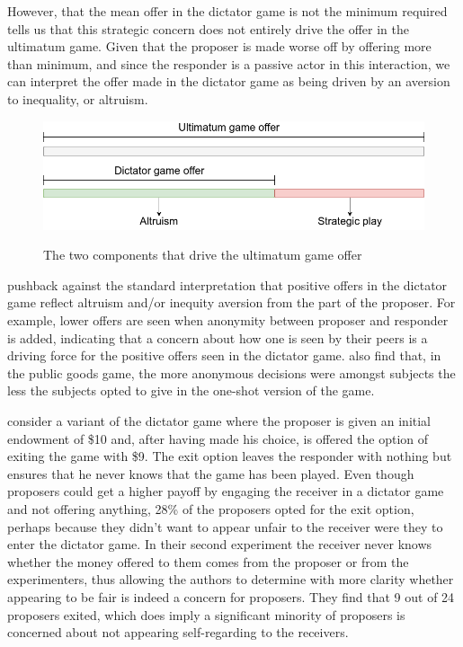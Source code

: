 \documentclass[12pt]{article}
\begin{document}
However, that the mean offer in the dictator game is not the minimum required tells us that this strategic concern does not entirely drive the offer in the ultimatum game. Given that the proposer is made worse off by offering more than minimum, and since the responder is a passive actor in this interaction, we can interpret the offer made in the dictator game as being driven by an aversion to inequality, or altruism.

\begin{figure}[H]
	\centering
	\caption{The two components that drive the ultimatum game offer}
	\includegraphics[width=1.\textwidth]{dictatoroffer.png}
	\label{fig:dictatorcomponent}
\end{figure}

\cite{list2007interpretation} pushback against the standard interpretation that positive offers in the dictator game reflect altruism and/or inequity aversion from the part of the proposer. For example, lower offers are seen when anonymity between proposer and responder is added, indicating that a concern about how one is seen by their peers is a driving force for the positive offers seen in the dictator game. \cite{list2004young} also find that, in the public goods game, the more anonymous decisions were amongst subjects the less the subjects opted to give in the one-shot version of the game. 

\cite{dana2006you} consider a variant of the dictator game where the proposer is given an initial endowment of \$10 and, after having made his choice, is offered the option of exiting the game with \$9. The exit option leaves the responder with nothing but ensures that he never knows that the game has been played. Even though proposers could get a higher payoff by engaging the receiver in a dictator game and not offering anything, 28\% of the proposers opted for the exit option, perhaps because they didn't want to appear unfair to the receiver were they to enter the dictator game. In their second experiment the receiver never knows whether the money offered to them comes from the proposer or from the experimenters, thus allowing the authors to determine with more clarity whether appearing to be fair is indeed a concern for proposers. They find that 9 out of 24 proposers exited, which does imply a significant minority of proposers is concerned about not appearing self-regarding to the receivers.
\end{document}
